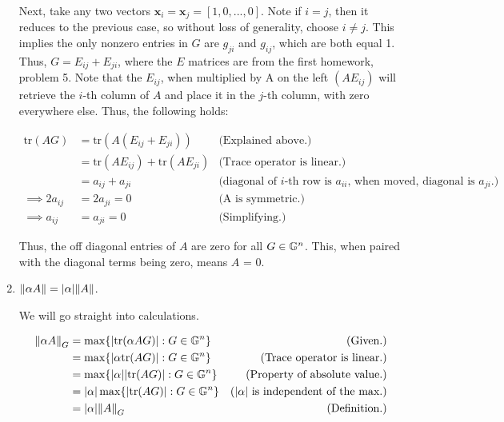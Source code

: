 \begin{solution}
\begin{enumerate}[(1)]
        \jump
        Next, take any two vectors $\textbf{x}_i = \textbf{x}_j = [1, 0, ..., 0]$. Note if $i = j$, then it reduces to the previous case, so without loss of generality, choose $i \neq j$. This implies the only nonzero entries in $G$ are $g_{ji}$ and $g_{ij}$, which are both equal 1. Thus, $G = E_{ij} + E_{ji}$, where the $E$ matrices are from the first homework, problem 5. Note that the $E_{ij}$, when multiplied by A on the left $(AE_{ij})$ will retrieve the $i$-th column of $A$ and place it in the $j$-th column, with zero everywhere else. Thus, the following holds:

        \alignbreak
        \begin{align}
            \text{tr}(AG) &= \text{tr}(A(E_{ij} + E_{ji})) &\text{(Explained above.)}\nonumber\\
            &= \text{tr}(AE_{ij}) + \text{tr}(AE_{ji}) &\text{(Trace operator is linear.)}\nonumber\\
            &= a_{ij} + a_{ji} &\text{(diagonal of $i$-th row is $a_{ii}$, when moved, diagonal is $a_{ji}$.)}\nonumber\\
            \implies 2a_{ij} &= 2a_{ji} = 0 &\text{(A is symmetric.)}\nonumber\\
            \implies a_{ij} &= a_{ji} = 0 &\text{(Simplifying.)}\nonumber
        \end{align}
        \alignbreak

           Thus, the off diagonal entries of $A$ are zero for all $G \in \mathbb{G}^n$. This, when paired with the diagonal terms being zero, means $A$ = 0.
            \newpage
           \item $\norm{\alpha A} = |\alpha| \norm{A}$.
            
            \jump
            We will go straight into calculations. 
            
            \alignbreak
            \begin{align}
                \norm{\alpha A}_G &= \max \{ |\text{tr}(\alpha AG)| : G \in \mathbb{G}^n \} &\text{(Given.)}\nonumber\\
                &= \max \{ |\alpha\text{tr}(AG)| : G \in \mathbb{G}^n \} &\text{(Trace operator is linear.)}\nonumber\\
                &= \max \{ |\alpha| |\text{tr}(AG)| : G \in \mathbb{G}^n \} &\text{(Property of absolute value.)}\nonumber\\
                &= |\alpha|\max \{ |\text{tr}(AG)| : G \in \mathbb{G}^n \} &\text{($|\alpha|$ is independent of the max.)}\nonumber\\
                &= |\alpha| \norm{A}_G &\text{(Definition.)}\nonumber
            \end{align}
            \alignbreak


\end{enumerate}
\end{solution}
